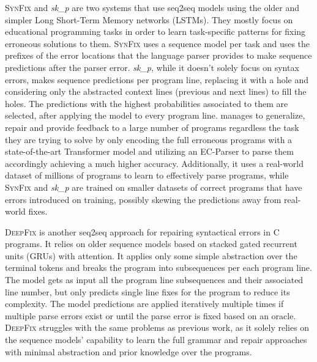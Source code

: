 %
\textsc{SynFix} \citep{Bhatia2016} and \emph{sk\_p} \citep{Pu2016} are two
systems that use seq2seq models using the older and simpler Long Short-Term
Memory networks (LSTMs). They mostly focus on educational programming tasks in
order to learn task-specific patterns for fixing erroneous solutions to them.
\textsc{SynFix} uses a sequence model per task and uses the prefixes of the
error locations that the language parser provides to make sequence predictions
after the parser error. \emph{sk\_p}, while it doesn't solely focus on syntax
errors, makes sequence predictions per program line, replacing it with a hole
and considering only the abstracted context lines (previous and next lines) to
fill the holes. The predictions with the highest probabilities associated to
them are selected, after applying the model to every program line. \toolname
manages to generalize, repair and provide feedback to a large number of programs
regardless the task they are trying to solve by only encoding the full erroneous
programs with a state-of-the-art Transformer model and utilizing an EC-Parser to
parse them accordingly achieving a much higher accuracy. Additionally, it uses a
real-world dataset of millions of \python programs to learn to effectively parse
programs, while \textsc{SynFix} and \emph{sk\_p} are trained on smaller datasets
of correct programs that have errors introduced on training, possibly skewing
the predictions away from real-world fixes.

\textsc{DeepFix} \citep{Gupta2017} is another seq2seq approach for repairing
syntactical errors in \textsc{C} programs. It relies on older sequence models
based on stacked gated recurrent units (GRUs) with attention. It applies only
some simple abstraction over the terminal tokens and breaks the program into
subsequences per each program line. The model gets as input all the program line
subsequences and their associated line number, but only predicts single line
fixes for the program to reduce its complexity. The model predictions are
applied iteratively multiple times if multiple parse errors exist or until the
parse error is fixed based on an oracle. \textsc{DeepFix} struggles with the
same problems as previous work, as it solely relies on the sequence models'
capability to learn the full grammar and repair approaches with minimal
abstraction and prior knowledge over the programs.

